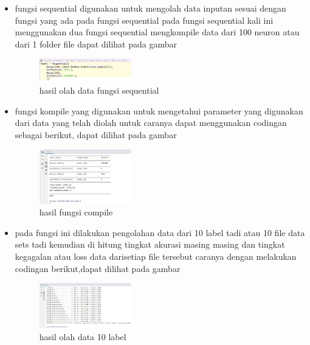 \begin{enumerate}
\begin{itemize}
        \item  fungsi sequential digunakan untuk mengolah data inputan sesuai dengan fungsi yang ada pada fungsi sequential pada fungsi sequential kali ini menggunakan dua fungsi sequential mengkompile data dari 100 neuron atau dari 1 folder file dapat dilihat pada gambar
        \begin{figure}[H]
            \includegraphics[width=4cm]{figures/1174039/chapter6/7.jpg}
            \centering
            \caption{hasil olah data fungsi sequential}
        \end{figure}
        
        \item  fungsi kompile yang digunakan untuk mengetahui parameter yang digunakan dari data yang telah diolah untuk caranya dapat menggunakan codingan sebagai berikut, dapat dilihat pada gambar
        \begin{figure}[H]
            \includegraphics[width=4cm]{figures/1174039/chapter6/8.jpg}
            \centering
            \caption{hasil fungsi compile}
        \end{figure}
        
        \item  pada fungsi ini dilakukan pengolahan data dari 10 label tadi atau 10 file data sets tadi kemudian di hitung tingkat akurasi masing masing dan tingkat kegagalan atau loss data darisetiap file tersebut caranya dengan melakukan codingan berikut,dapat dilihat pada gambar
        \begin{figure}[H]
            \includegraphics[width=4cm]{figures/1174039/chapter6/9.jpg}
            \centering
            \caption{hasil olah data 10 label}
        \end{figure}
        

\end{itemize}
\end{enumerate}

